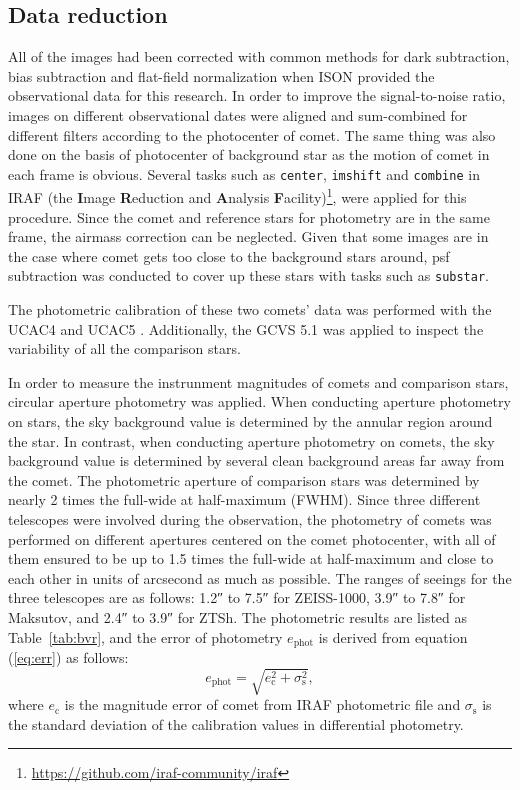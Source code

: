\subsection{Data reduction}

All of the images had been corrected with common methods for dark subtraction, bias subtraction and flat-field normalization when ISON provided the observational data for this research. In order to improve the signal-to-noise ratio, images on different observational dates were aligned and sum-combined for different filters according to the photocenter of comet. The same thing was also done on the basis of photocenter of background star as the motion of comet in each frame is obvious. Several tasks such as \texttt{center}, \texttt{imshift} and \texttt{combine} in IRAF (the \textbf{I}mage \textbf{R}eduction and \textbf{A}nalysis \textbf{F}acility)\footnote{\url{https://github.com/iraf-community/iraf}}, were applied for this procedure. Since the comet and reference stars for photometry are in the same frame, the airmass correction can be neglected. Given that some images are in the case where comet gets too close to the background stars around, psf subtraction was conducted to cover up these stars with tasks such as \verb|substar|. 

The photometric calibration of these two comets' data was performed with the UCAC4 \citep{zacharias_fourth_2013} and UCAC5 \citep{zacharias_ucac5_2017}. Additionally, the GCVS 5.1 \citep{samus_general_2017} was applied to inspect the variability of all the comparison stars. 

In order to measure the  instrunment magnitudes of comets and comparison stars, circular aperture photometry was applied. When conducting aperture photometry on stars, the sky background value is determined by the annular region around the star. In contrast, when conducting aperture photometry on comets, the sky background value is determined by several clean background areas far away from the comet. The photometric aperture of comparison stars was determined by nearly \si{\num{2}} times the full-wide at half-maximum (FWHM). Since three different telescopes were involved during the observation, the photometry of comets was performed on different apertures centered on the comet photocenter, with all of them ensured to be up to \si{\num{1.5}} times the full-wide at half-maximum and close to each other in units of arcsecond as much as possible. 
The ranges of seeings for the three telescopes are as follows: \ang{;;1.2} to \ang{;;7.5} for ZEISS-1000, \ang{;;3.9} to \ang{;;7.8} for Maksutov, and \ang{;;2.4} to \ang{;;3.9} for ZTSh. 
The photometric results are listed as Table~\ref{tab:bvr}, and the error of photometry $e_{\mathrm{phot}}$ is derived from equation (\ref{eq:err}) as follows: 
\begin{equation}
    e_{\mathrm{phot}} = \sqrt{e_{\mathrm{c}}^{2} + \sigma_\mathrm{s}^2}, 
    \label{eq:err}
\end{equation}
where $e_\mathrm{c}$ is the magnitude error of comet from IRAF photometric file and $\sigma_\mathrm{s}$ is the standard deviation of the calibration values in differential photometry. 






